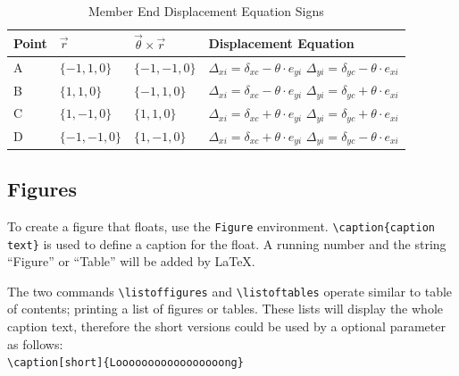 \documentclass[10pt, a4paper]{article}
\begin{document}
\begin{table}
	\centering
	\caption{Member End Displacement Equation Signs}
	\label{tab:columnEndDisplacementSigns}
	\begin{tabularx}{\textwidth}{XXXX}
		\toprule \centering \rule[-2ex]{0pt}{5.5ex} Point & \centering  $\overrightarrow{r}$ & \centering $\overrightarrow{\theta} \times \overrightarrow{r}$ & Displacement Equation \\ 
		\midrule \centering \rule[-2ex]{0pt}{5.5ex} A & \centering  $\{-1, 1, 0\}$ & \centering $\{-1, -1, 0\}$ & $\Delta_{xi} = \delta_{xc} - \theta \cdot e_{yi}$ \newline  $\Delta_{yi} = \delta_{yc} - \theta \cdot e_{xi}$ \\ 
		\centering \rule[-2ex]{0pt}{5.5ex} B & \centering  $\{1, 1, 0\}$  & \centering $\{-1, 1, 0\}$ &  $\Delta_{xi} = \delta_{xc} - \theta \cdot e_{yi}$ \newline  $\Delta_{yi} = \delta_{yc} + \theta \cdot e_{xi}$\\ 
		\centering \rule[-2ex]{0pt}{5.5ex} C & \centering  $\{1, -1, 0\}$ & \centering $\{1, 1, 0\}$ & $\Delta_{xi} = \delta_{xc} + \theta \cdot e_{yi}$ \newline  $\Delta_{yi} = \delta_{yc} + \theta \cdot e_{xi}$ \\ 
		\centering \rule[-2ex]{0pt}{5.5ex} D & \centering  $\{-1, -1, 0\}$  & \centering $\{1, -1, 0\}$ & $\Delta_{xi} = \delta_{xc} + \theta \cdot e_{yi}$ \newline  $\Delta_{yi} = \delta_{yc} - \theta \cdot e_{xi}$ \\ 
		\bottomrule
	\end{tabularx} 
\end{table}

\subsection{Figures}
To create a figure that floats, use the \texttt{Figure} environment. \texttt{\textbackslash caption\{caption text\}} is used to define a caption for the float. A running number and the string ``Figure'' or ``Table'' will be added by \LaTeX. 

The two commands \texttt{\textbackslash listoffigures} and \texttt{\textbackslash listoftables} operate similar to table of contents; printing a list of figures or tables. These lists will display the whole caption text, therefore the short versions could be used by a optional parameter as follows: \\
\texttt{\textbackslash caption[short]\{Looooooooooooooooong\}}\\
\end{document}

